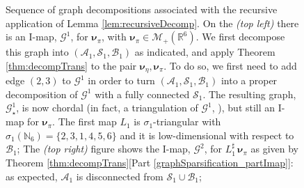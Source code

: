 \documentclass[twoside,11pt]{article}
\newcommand{\colorA}{red!40}
\newcommand{\colorB}{yellow!50}
\newcommand{\colorS}{orange!40}
\newcommand{\valueInnerSep}{1em}
\newcommand{\borelm}{\mathscr{M}}
\newcommand{\borelmp}{\borelm_+}
\newcommand{\genm}{\boldsymbol{\nu} }   %
\newcommand{\re}{\mathbb{R}}
\newcommand{\Bc}{\mathcal{B}}
\newcommand{\Ac}{\mathcal{A}}
\newcommand{\Sc}{\mathcal{S}}
\newcommand{\Gcb}{\boldsymbol{\mathcal{G}}}
\newcommand{\lmap}{L} %
\newcommand{\Aset}{ \Ac }
\newcommand{\Bset}{ \Bc }
\newcommand{\Sset}{ \Sc }
\newcommand{\pull}{^\sharp}
\begin{document}
\begin{figure}[]
{
}       
        \caption[]{
        Sequence of graph decompositions associated with
        the recursive application of Lemma \ref{lem:recursiveDecomp}.
        On the  
        \emph{(top left)} there 
        is an I-map, $\Gcb^1$, for $\genm_\pi$, with
        $\genm_\pi \in \borelmp(\re^6)$. 
        We first
        decompose this graph into $(\Aset_1,\Sset_1,\Bset_1)$ as indicated,
        and apply Theorem \ref{thm:decompTrans} to the pair 
        $\genm_\eta, \genm_\pi$. 
        To do so, we first need to add edge $(2,3)$ to $\Gcb^1$ in order to turn
        $(\Aset_1,\Sset_1,\Bset_1)$ into a proper decomposition of
        $\Gcb^1$ with a fully connected $\Sset_1$. %
        The resulting graph, $\Gcb^{1}_\star$, is now chordal 
        (in fact, a triangulation of
        $\Gcb^1$, \citealp{lauritzen1996graphical}), but still an 
        I-map for $\genm_\pi$.
        The first
        map $\lmap_1$ is $\sigma_1$-triangular with %
        $\sigma_1(\mathbb{N}_6)= \{2,3,1,4,5,6\}$ and it is
        low-dimensional with respect to $\Bset_1$;
        The \emph{(top right)} figure shows  the 
        I-map, $\Gcb^2$, for %
        $\lmap_1\pull \, \genm_\pi$ as
        given by Theorem \ref{thm:decompTrans}[Part \ref{graphSparsification_partImap}]:
        as expected, $\Aset_1$ is disconnected from $\Sset_1 \cup \Bset_1$;
}
\end{figure}
\end{document}
